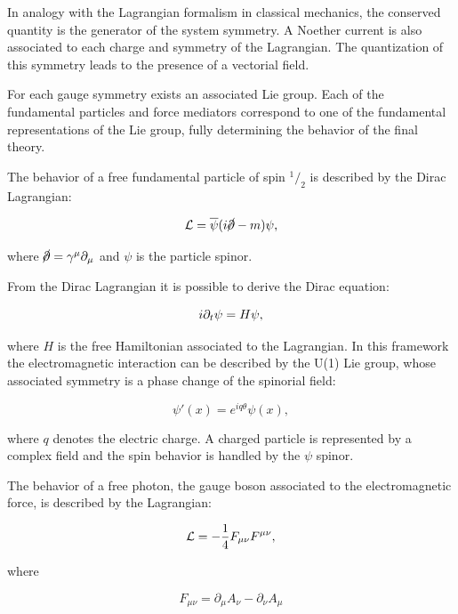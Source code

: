 In analogy with the Lagrangian formalism in classical mechanics, the conserved quantity is the generator of the system symmetry. A Noether current is also associated to each charge and symmetry of the Lagrangian. The quantization of this symmetry leads to the presence of a vectorial field. 

For each gauge symmetry exists an associated Lie group. Each of the fundamental particles and force mediators correspond to one of the fundamental representations of the Lie group, fully determining the behavior of the final theory.

The behavior of a free fundamental particle of spin $^1/_2$ is described by the Dirac Lagrangian:

\begin{equation}
\mathcal{L}=\overline{\psi}(i\cancel{\partial}-m)\psi,
\label{eq:dirac_lag}
\end{equation}

where $\cancel{\partial} = \gamma^\mu \partial_\mu$ and $\psi$ is the particle spinor. %

From the Dirac Lagrangian it is possible to derive the Dirac equation:

\begin{equation}
i \partial_t\psi = H \psi,
\label{eq:dirac_lag}
\end{equation}

where $H$ is the free Hamiltonian associated to the Lagrangian.
In this framework the electromagnetic interaction can be described by the U(1) Lie group, whose associated symmetry is a phase change of the spinorial field: %

\begin{equation}
\psi'(x) = e^{iq\theta}\psi(x),
\end{equation}

where $q$ denotes the electric charge.
A charged particle is represented by a complex field and the spin behavior is handled by the $\psi$ spinor.

The behavior of a free photon, the gauge boson associated to the electromagnetic force, is described by the Lagrangian:

\begin{equation}
\mathcal{L} = -\frac{1}{4}F_{\mu\nu}F^{\mu\nu},
\end{equation}

where

\begin{equation}
 F_{\mu\nu} =\partial_{\mu}A_{\nu}-\partial_{\nu}A_{\mu}
\end{equation}

